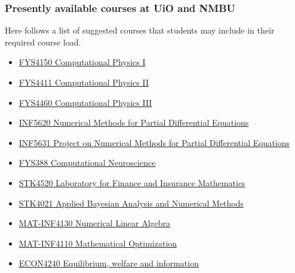 \documentclass{beamer}
\begin{document}
\begin{frame}
\frametitle{Presently available courses at UiO and NMBU}

\begin{block}{}
Here follows a list of suggested courses that students may include in their required course load.

\begin{itemize}
\item \href{{http://www.uio.no/studier/emner/matnat/fys/FYS4150/index-eng.html}}{FYS4150 Computational Physics I}

\item \href{{http://www.uio.no/studier/emner/matnat/fys/FYS4411/}}{FYS4411 Computational Physics II}

\item \href{{http://www.uio.no/studier/emner/matnat/fys/FYS4460/}}{FYS4460 Computational Physics III}

\item \href{{http://www.uio.no/studier/emner/matnat/ifi/INF5620/index-eng.html}}{INF5620 Numerical Methods for Partial Differential Equations}

\item \href{{http://www.uio.no/studier/emner/matnat/ifi/INF5631/index-eng.html}}{INF5631 Project on Numerical Methods for Partial Differential Equations}

\item \href{{http://www.nmbu.no/course/FYS388}}{FYS388 Computational Neuroscience}

\item \href{{http://www.uio.no/studier/emner/matnat/math/STK4520/index-eng.html}}{STK4520 Laboratory for Finance and Insurance Mathematics}

\item \href{{http://www.uio.no/studier/emner/matnat/math/STK4021/index-eng.html}}{STK4021 Applied Bayesian Analysis and Numerical Methods}

\item \href{{http://www.uio.no/studier/emner/matnat/math/MAT-INF4130/index-eng.html}}{MAT-INF4130  Numerical Linear Algebra}

\item \href{{http://www.uio.no/studier/emner/matnat/math/MAT-INF4110/index.html}}{MAT-INF4110 Mathematical Optimization}

\item \href{{http://www.uio.no/studier/emner/sv/oekonomi/ECON4240/index.html}}{ECON4240 Equilibrium, welfare and information}


\end{itemize}
\end{block}
\end{frame}
\end{document}
